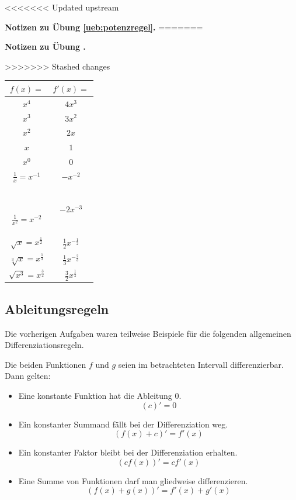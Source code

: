 \documentclass[%
<<<<<<< Updated upstream
11pt,%
twoside,%
titlepage,%
german,%
=======
11pt,%
twoside,%
titlepage,%
swissgerman,%
>>>>>>> Stashed changes
headsepline%
]{scrartcl}
\newcommand{\faReturnGray}{\textcolor{gray}{\faMailReply}} %
\theoremstyle{definition}
\theoremstyle{plain}
\newcommand{\concatueb}[1]{ueb:#1}%
\newcommand{\concatlsg}[1]{lsg:#1}%
\newcounter{uebcounter}[section]
\renewcommand{\theuebcounter}{\thesection.\arabic{uebcounter}}  %
\newenvironment{lsg}[1]{%
<<<<<<< Updated upstream
    \par\noindent\textbf{Notizen zu Übung \ref{\concatueb{#1}}.}%
    \label{\concatlsg{#1}}
=======
    \par\noindent\textbf{Notizen zu Übung \theuebcounter\label{\concatlsg{#1}}}
    \hfill\hyperref[\concatueb{#1}]{\faReturnGray}\par %
>>>>>>> Stashed changes
}{%
    \par%
}
\begin{document}
\begin{lsg}{potenzregel}
\def\mytabbottom{-2mm}
\def\mytabtop{6mm}
\begin{center}
\begin{tabular}{|c|c|}
\hline
\rule[\mytabbottom]{0pt}{\mytabtop}$f(x)=$ & $f'(x)=$\\ \hline
\rule[\mytabbottom]{0pt}{\mytabtop}$x^4$ & $4x^3$\\ \hline
\rule[\mytabbottom]{0pt}{\mytabtop}$x^3$ & $3x^2$\\ \hline
\rule[\mytabbottom]{0pt}{\mytabtop}$x^2$ & $2x$\\ \hline
\rule[\mytabbottom]{0pt}{\mytabtop}$x$ & $1$\\ \hline
\rule[\mytabbottom]{0pt}{\mytabtop}$x^0$ & $0$\\ \hline
\rule[\mytabbottom]{0pt}{\mytabtop}$\frac{1}{x}=x^{-1}$ & $-x^{-2}$\\ \hline\
\rule[\mytabbottom]{0pt}{\mytabtop}$\frac{1}{x^2}=x^{-2}$ & $-2x^{-3}$\\ \hline
\rule[\mytabbottom]{0pt}{\mytabtop}$\sqrt{x}=x^{\frac{1}{2}}$ & $\frac{1}{2}x^{-\frac{1}{2}}$\\ \hline
\rule[\mytabbottom]{0pt}{\mytabtop}$\sqrt[3]{x}=x^{\frac{1}{3}}$ & $\frac{1}{3}x^{-\frac{2}{3}}$\\ \hline
\rule[\mytabbottom]{0pt}{\mytabtop}$\sqrt{x^3}=x^{\frac{3}{2}}$ & $\frac{3}{2}x^\frac{1}{2}$\\ \hline
\end{tabular}
\end{center}
\end{lsg}

\clearpage

\subsection{Ableitungsregeln}

Die
vorherigen Aufgaben waren teilweise Beispiele f\"ur die folgenden allgemeinen Differenziations\-regeln.

Die beiden Funktionen $f$ und $g$ seien im betrachteten Intervall differenzierbar. Dann gelten:

\begin{itemize}
\item Eine konstante Funktion hat die Ableitung $0$.
$$(c)'=0$$
\item Ein konstanter Summand f\"allt bei der Differenziation weg.
$$(f(x)+c)'= f'(x)$$
\item Ein konstanter Faktor bleibt bei der Differenziation erhalten.
$$(cf(x))'=cf'(x)$$
\item Eine Summe von Funktionen darf man gliedweise differenzieren.
$$(f(x)+g(x))'=f'(x)+g'(x)$$
\end{itemize}
\end{document}
